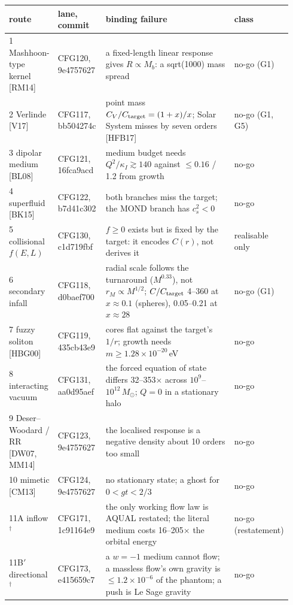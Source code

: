 \documentclass[10pt]{article}
\begin{document}
{\small
\setlength{\tabcolsep}{3pt}
\begin{longtable}{L{0.17\linewidth}L{0.17\linewidth}L{0.48\linewidth}L{0.12\linewidth}}
\toprule
route & lane, commit & binding failure & class \\
\midrule
{} Mashhoon-type kernel [RM14] & CFG120, 9e4757627 & a fixed-length linear response gives $R\propto M_b$: a sqrt(1000) mass spread & no-go (G1) \\
2 Verlinde [V17] & CFG117, bb504274c & point mass $C_V/C_{\rm target}=(1+x)/x$; Solar System misses by seven orders [HFB17] & no-go (G1, G5) \\
3 dipolar medium [BL08] & CFG121, 16fca9acd & medium budget needs $Q^2/\kappa_I\gtrsim140$ against $\le0.16$ / 1.2 from growth & no-go \\
4 superfluid [BK15] & CFG122, b7d41c302 & both branches miss the target; the MOND branch has $c_s^2<0$ & no-go \\
5 collisional $f(E,L)$ & CFG130, c1d719fbf & $f\ge0$ exists but is fixed by the target: it encodes $C(r)$, not derives it & realisable only \\
6 secondary infall & CFG118, d0baef700 & radial scale follows the turnaround ($M^{0.33}$), not $r_M\propto M^{1/2}$; $C/C_{\rm target}$ 4--360 at $x\approx0.1$ (spheres), 0.05--0.21 at $x\approx28$ & no-go (G1) \\
7 fuzzy soliton [HBG00] & CFG119, 435cb43e9 & cores flat against the target's $1/r$; growth needs $m\ge1.28\times10^{-20}$\,eV & no-go \\
8 interacting vacuum & CFG131, aa0d95aef & the forced equation of state differs 32--353$\times$ across $10^9$--$10^{12}\,M_\odot$; $Q=0$ in a stationary halo & no-go \\
9 Deser--Woodard / RR [DW07, MM14] & CFG123, 9e4757627 & the localised response is a negative density about 10 orders too small & no-go \\
10 mimetic [CM13] & CFG124, 9e4757627 & no stationary state; a ghost for $0<g t<2/3$ & no-go \\
11A inflow$^\dagger$ & CFG171, 1c91164e9 & the only working flow law is AQUAL restated; the literal medium costs 16--205$\times$ the orbital energy & no-go (restatement) \\
11B$'$ directional$^\dagger$ & CFG173, e415659c7 & a $w=-1$ medium cannot flow; a massless flow's own gravity is $\le1.2\times10^{-6}$ of the phantom; a push is Le Sage gravity & no-go \\

\end{longtable}}
\end{document}
